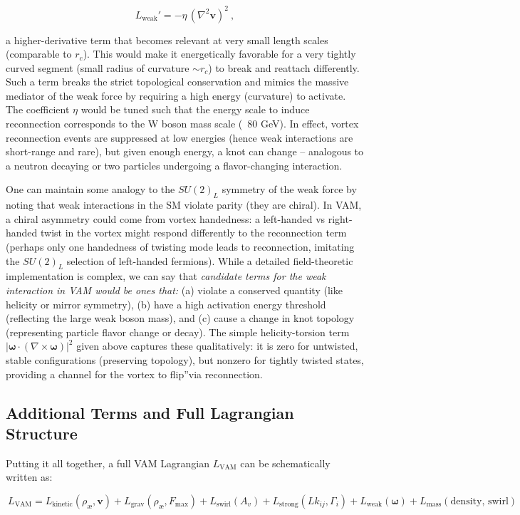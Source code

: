 \[
    L_{\text{weak}}' = -\eta\,(\nabla^2 \mathbf{v})^2~,
\]

a higher-derivative term that becomes relevant at very small length scales (comparable to $r_c$). This would make it energetically favorable for a very tightly curved segment (small radius of curvature $\sim r_c$) to break and reattach differently. Such a term breaks the strict topological conservation and mimics the massive mediator of the weak force by requiring a high energy (curvature) to activate. The coefficient $\eta$ would be tuned such that the energy scale to induce reconnection corresponds to the W boson mass scale (~80 GeV). In effect, vortex reconnection events are suppressed at low energies (hence weak interactions are short-range and rare), but given enough energy, a knot can change – analogous to a neutron decaying or two particles undergoing a flavor-changing interaction.


One can maintain some analogy to the $SU(2)_L$ symmetry of the weak force by noting that weak interactions in the SM violate parity (they are chiral). In VAM, a chiral asymmetry could come from vortex handedness: a left-handed vs right-handed twist in the vortex might respond differently to the reconnection term (perhaps only one handedness of twisting mode leads to reconnection, imitating the $SU(2)_L$ selection of left-handed fermions). While a detailed field-theoretic implementation is complex, we can say that \textit{candidate terms for the weak interaction in VAM would be ones that:} (a) violate a conserved quantity (like helicity or mirror symmetry), (b) have a high activation energy threshold (reflecting the large weak boson mass), and (c) cause a change in knot topology (representing particle flavor change or decay). The simple helicity-torsion term $|\mathbf{\omega}\cdot(\nabla\times\mathbf{\omega})|^2$ given above captures these qualitatively: it is zero for untwisted, stable configurations (preserving topology), but nonzero for tightly twisted states, providing a channel for the vortex to \grqq flip\textquotedblright via reconnection.

\subsection{Additional Terms and Full Lagrangian Structure}
Putting it all together, a full VAM Lagrangian $L_{\text{VAM}}$ can be schematically written as:


\begin{equation}
    \boxed{\ L_{\text{VAM}} = L_{\text{kinetic}}(\rho_{\text{\ae}},\mathbf{v}) + L_{\text{grav}}(\rho_{\text{\ae}},F_{\max}) + L_{\text{swirl}}(A_v) + L_{\text{strong}}(Lk_{ij}, \Gamma_i) + L_{\text{weak}}(\mathbf{\omega}) + L_{\text{mass}}(\text{density, swirl})}
\end{equation}

